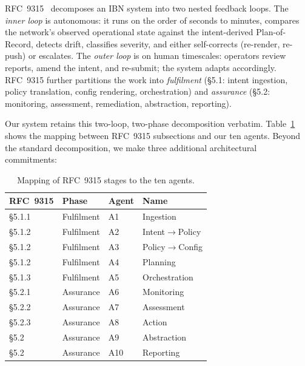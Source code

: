 \documentclass[acmtog]{acmart}
\renewcommand\_{\textunderscore\allowbreak}
\begin{document}
RFC~9315~\cite{rfc9315} decomposes an IBN system into two nested
feedback loops. The \emph{inner loop} is autonomous: it runs on the
order of seconds to minutes, compares the network's observed
operational state against the intent-derived Plan-of-Record, detects
drift, classifies severity, and either self-corrects (re-render,
re-push) or escalates. The \emph{outer loop} is on human timescales:
operators review reports, amend the intent, and re-submit; the system
adapts accordingly. RFC~9315 further partitions the work into
\emph{fulfilment} (\S5.1: intent ingestion, policy translation, config
rendering, orchestration) and \emph{assurance} (\S5.2: monitoring,
assessment, remediation, abstraction, reporting).

Our system retains this two-loop, two-phase decomposition verbatim.
Table~\ref{tab:rfc-mapping} shows the mapping between RFC~9315
subsections and our ten agents. Beyond the standard decomposition, we
make three additional architectural commitments:

\begin{table}[t]
\small
\centering
\caption{Mapping of RFC~9315 stages to the ten agents.}
\label{tab:rfc-mapping}
\begin{tabular}{@{}llll@{}}
\toprule
\textbf{RFC~9315} & \textbf{Phase} & \textbf{Agent} & \textbf{Name}\\
\midrule
\S5.1.1 & Fulfilment & A1 & Ingestion\\
\S5.1.2 & Fulfilment & A2 & Intent$\rightarrow$Policy\\
\S5.1.2 & Fulfilment & A3 & Policy$\rightarrow$Config\\
\S5.1.2 & Fulfilment & A4 & Planning\\
\S5.1.3 & Fulfilment & A5 & Orchestration\\
\S5.2.1 & Assurance  & A6 & Monitoring\\
\S5.2.2 & Assurance  & A7 & Assessment\\
\S5.2.3 & Assurance  & A8 & Action\\
\S5.2   & Assurance  & A9 & Abstraction\\
\S5.2   & Assurance  & A10 & Reporting\\
\bottomrule
\end{tabular}
\end{table}
\end{document}
